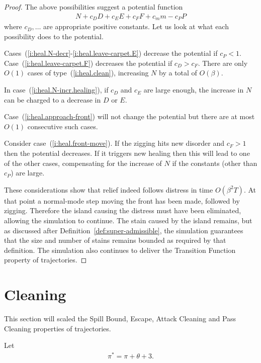 \documentclass[11pt]{memoir}
\theoremstyle{definition} %
\newcommand{\passno}{\pi}
\newcommand{\Tu}{T}
\begin{document}
\begin{proof}
The above possibilities suggest a potential function
\begin{align*}
   N + c_{D}D + c_{E}E + c_{F}F + c_{m}m - c_{P}P
 \end{align*}
where \( c_{D},\dots \) are appropriate positive constants.
Let us look at what each possibility does to the potential.

Cases~(\ref{i:heal.N-decr}-\ref{i:heal.leave-carpet.E}) decrease the potential if \( c_{P}<1 \).
Case~(\ref{i:heal.leave-carpet.F}) decreases the potential if \( c_{D}>c_{F} \).
There are only \( O(1) \) cases of type~(\ref{i:heal.clean}), increasing \( N \) by a total of \( O(\beta) \).

In case~(\ref{i:heal.N-incr.healing}), if \( c_{D} \) and \( c_{E} \) are large enough,
the increase in \( N \) can be charged to a decrease in \( D \) or \( E \).

Case~(\ref{i:heal.approach-front}) will not change the potential but there are at most \( O(1) \)
consecutive such cases.
 
Consider case~(\ref{i:heal.front-move}).
If the zigging hits new disorder and \( c_{F}>1 \) then the potential decreases.
If it triggers new healing then this will lead to one of the other cases,
compensating for the increase of \( N \) if the constants (other than \( c_{P} \)) are large.

These considerations show that relief indeed follows distress in time \( O(\beta^{2}\Tu) \).
At that point a normal-mode step moving the front has been made, followed by zigging.
Therefore the island causing the distress must have been eliminated, allowing the 
simulation to continue.
The stain caused by the island remains, but as discussed after Definition~\ref{def:super-admissible},
the simulation guarantees that the
size and number of stains remains bounded as required by that definition.
The simulation also continues to deliver the Transition Function property of trajectories.
\end{proof}

\section{Cleaning}\label{sec:cleaning}

This section will scaled the Spill Bound, Escape, Attack Cleaning
and Pass Cleaning properties of trajectories.

Let
\begin{align}\label{eq:pi-star}
 \passno^{*}= \passno +\theta+3.
\end{align}
\end{document}
